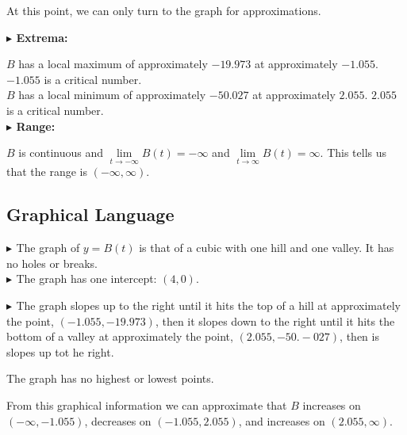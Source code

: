 \documentclass{ximera}
\begin{document}
\begin{exercise}
At this point, we can only turn to the graph for approximations.


\textbf{\textcolor{blue!55!black}{$\blacktriangleright$ Extrema: }}  

$B$ has a local maximum of approximately $-19.973$ at approximately $-1.055$.  $-1.055$ is a critical number. \\





$B$ has a local minimum of approximately $-50.027$ at approximately $2.055$.  $2.055$ is a critical number. \\









\textbf{\textcolor{blue!55!black}{$\blacktriangleright$ Range: }}


$B$ is continuous and  $\lim\limits_{t \to -\infty} B(t) = -\infty$  and $\lim\limits_{t \to \infty} B(t) = \infty$.  This tells us that the range is $(-\infty, \infty)$.








\subsection*{Graphical Language}







\textbf{\textcolor{blue!55!black}{$\blacktriangleright$ }}  The graph of $y = B(t)$ is that of a cubic with one hill and one valley. It has no holes or breaks. \\

\textbf{\textcolor{blue!55!black}{$\blacktriangleright$ }}  The graph has one intercept: $(4, 0)$.









\textbf{\textcolor{blue!55!black}{$\blacktriangleright$ }}  The graph slopes up to the right until it hits the top of a hill at approximately the point, $(-1.055, -19.973)$, then it slopes down to the right until it hits the bottom of a valley at approximately the point, $(2.055, -50.-027)$, then is slopes up tot he right.



The graph has no highest or lowest points.




From this graphical information we can approximate that $B$ increases on $(-\infty, -1.055)$, decreases on $(-1.055, 2.055)$, and increases on $(2.055, \infty)$.



\end{exercise}
\end{document}
